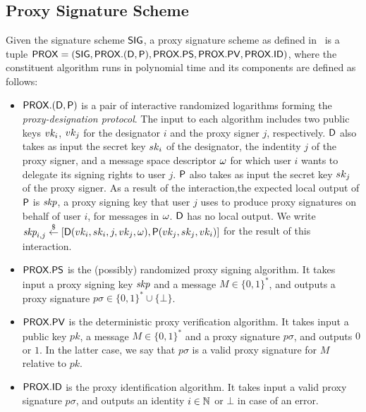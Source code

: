 \subsection{Proxy Signature Scheme}\label{sec:proxysig}
Given the signature scheme $\mathsf{SIG}$, a proxy signature scheme as defined in~\cite{JC:BolPalWar12} is a tuple $\mathsf{PROX}=(\mathsf{SIG},\mathsf{PROX}.(\mathsf{D},\mathsf{P}),\mathsf{PROX}.\mathsf{PS},\mathsf{PROX}.\mathsf{PV},\mathsf{PROX}.\mathsf{ID})$, where the constituent algorithm runs in polynomial time and its components are defined as follows:
\begin{itemize}
    \item $\mathsf{PROX}.(\mathsf{D},\mathsf{P})$  is a pair of interactive randomized logarithms forming the \textit{proxy-designation protocol}. The input to each algorithm includes two public keys $vk_{i}$, $vk_{j}$ for the designator $i$ and the proxy signer $j$, respectively. $\mathsf{D}$ also takes as input the secret key $sk_{i}$ of the designator, the indentity $j$ of the proxy signer, and a message space descriptor $\omega$ for which user $i$ wants to delegate its signing rights to user $j$. $\mathsf{P}$ also takes as input the secret key $sk_{j}$ of the proxy signer. As a result of the interaction,the expected local output of $\mathsf{P}$ is $\textit{skp}$, a proxy signing key that user $j$ uses to produce proxy signatures on behalf of user $i$, for messages in $\omega$. $\mathsf{D}$ has no local output. We write $\textit{skp}_{i,j} \stackrel{\$}{\leftarrow} [\mathsf{D} (vk_{i},sk_{i},j,vk_{j},\omega),\mathsf{P} (vk_{j},sk_{j},vk_{i})]$ for the result of this interaction.
    
    \item $\mathsf{PROX}.\mathsf{PS}$ is the (possibly) randomized proxy signing algorithm. It takes input a proxy signing key $\textit{skp}$ and a message $M\in\{0,1\}^\ast$, and outputs a proxy signature $p\sigma\in\{0,1\}^\ast\cup \{\bot\}$.
    
    \item $\mathsf{PROX}.\mathsf{PV}$ is the deterministic proxy verification algorithm. It takes input a public key $pk$, a message $M\in\{0,1\}^\ast$ and a proxy signature $p\sigma$, and outputs $0$ or $1$. In the latter case, we say that $p\sigma$ is a valid proxy signature for $M$ relative to $pk$.
    
    \item $\mathsf{PROX}.\mathsf{ID}$ is the proxy identification algorithm. It takes input a valid proxy signature $p\sigma$, and outputs an identity $i\in\mathbb{N}$ or $\bot$ in case of an error.
\end{itemize}

